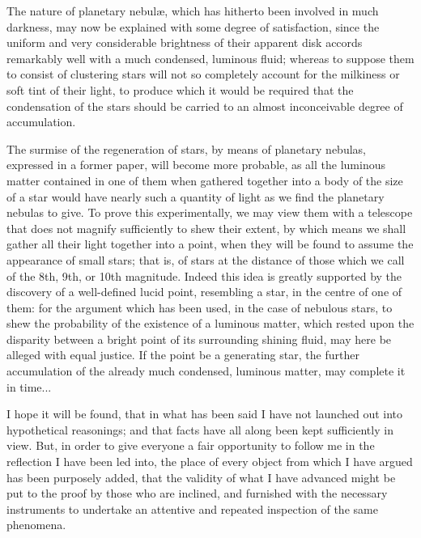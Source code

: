 \documentclass[a4paper, 12pt, oneside, polutonikogreek, english]{article}
\begin{document}
The nature of planetary nebulæ, which has hitherto been involved in much darkness, may now be explained with some degree of satisfaction, since the uniform and very considerable brightness of their apparent disk accords remarkably well with a much condensed, luminous fluid; whereas to suppose them to consist of clustering stars will not so completely account for the milkiness or soft tint of their light, to produce which it would be required that the condensation of the stars should be carried to an almost inconceivable degree of accumulation.

The surmise of the regeneration of stars, by means of planetary nebulas, expressed in a former paper, will become more probable, as all the luminous matter contained in one of them when gathered together into a body of the size of a star would have nearly such a quantity of light as we find the planetary nebulas to give. To prove this experimentally, we may view them with a telescope that does not magnify sufficiently to shew their extent, by which means we shall gather all their light together into a point, when they will be found to assume the appearance of small stars; that is, of stars at the distance of those which we call of the 8th, 9th, or 10th magnitude. Indeed this idea is greatly supported by the discovery of a well-defined lucid point, resembling a star, in the centre of one of them: for the argument which has been used, in the case of nebulous stars, to shew the probability of the existence of a luminous matter, which rested upon the disparity between a bright point of its surrounding shining fluid, may here be alleged with equal justice. If the point be a generating star, the further accumulation of the already much condensed, luminous matter, may complete it in time...

I hope it will be found, that in what has been said I have not launched out into hypothetical reasonings; and that facts have all along been kept sufficiently in view. But, in order to give everyone a fair opportunity to follow me in the reflection I have been led into, the place of every object from which I have argued has been purposely added, that the validity of what I have advanced might be put to the proof by those who are inclined, and furnished with the necessary instruments to undertake an attentive and repeated inspection of the same phenomena.
\end{document}
